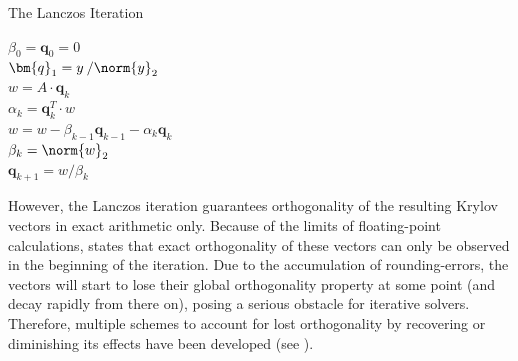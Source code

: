 \begin{algorithm}[h]
  \caption{The Lanczos Iteration}
  \label{alg:lanczos}
  \SetAlgoLined
  $\beta_0= \bm{q}_0 =0 $\\
  $\bm{q}_1= y\:/\norm{y}_2$ \\
   {
    $w =A\cdot \bm{q}_k$ \\
    $\alpha_k = \bm{q}_k^T\cdot w$ \\
    $w = w -\beta_{k-1}\bm{q}_{k-1}-\alpha_k\bm{q}_k$ \\
    $\beta_k = \norm{w}_2$ \\
    $\bm{q}_{k+1} = w/\beta_k$
  }
\end{algorithm}

However, the Lanczos iteration guarantees orthogonality of the resulting Krylov vectors in exact arithmetic only. Because of the limits of floating-point calculations, \cite{saad_gmres_1986} states that exact orthogonality of these vectors can only be observed in the beginning of the iteration. Due to the accumulation of rounding-errors, the vectors will start to lose their global orthogonality property at some point (and decay rapidly from there on), posing a serious obstacle for iterative solvers. Therefore, multiple schemes to account for lost orthogonality by recovering or diminishing its effects have been developed (see \cite{parlett_beresford_n_13_1998}).

